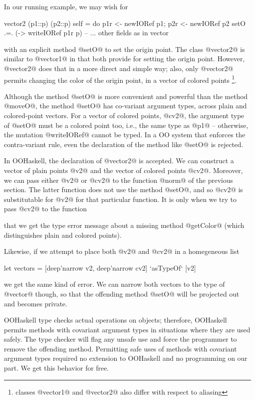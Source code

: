 \documentclass{jfp}
\begin{document}
In our running example, we may wish for
\begin{code}
vector2 (p1::p) (p2::p) self =
   do p1r <- newIORef p1; p2r <- newIORef p2
       setO     .=. (\p -> writeIORef p1r p)
       -- ... other fields as in vector 
\end{code}
with an explicit method @setO@ to set the origin point. The class
@vector2@ is similar to @vector1@ in that both provide for setting the
origin point. However, @vector2@ does that in a more direct and simple
way; also, only @vector2@ permits changing the color of the origin
point, in a vector of colored points \footnote{classes @vector1@ and
  @vector2@ also differ with respect to aliasing}.

Although the method @setO@ is more convenient and powerful than the
method @moveO@, the method @setO@ has co-variant argument types, across
plain and colored-point vectors. For a vector of colored points,
@cv2@, the argument type of @setO@ must be a colored point too, i.e.,
the same type as @p1@ -- otherwise, the mutation @writeIORef@ cannot
be typed. In a OO system that enforces the contra-variant rule, even
the declaration of the method like @setO@ is rejected.

In OOHaskell, the declaration of @vector2@ is accepted. We can
construct a vector of plain points @v2@ and the vector of colored
points @cv2@. Moreover, we can pass either @v2@ or @cv2@ to the
function @norm@ of the previous section. The latter function
does not use the method @setO@, and so @cv2@ is substitutable for @v2@
for that particular function. It is only when we try to pass @cv2@ to
the function
that we get the type error message about a missing method @getColor@
(which distinguishes plain and colored points). 

Likewise, if we attempt to place both @v2@ and @cv2@ in a homegeneous
list
\begin{code}
let vectors = [deep'narrow v2, deep'narrow cv2]
	      `asTypeOf` [v2]
\end{code}
we get the same kind of error. We can narrow both vectors to the type
of @vector@ though, so that the offending method @setO@ will be
projected out and becomes private.

OOHaskell type checks actual operations on objects; therefore,
OOHaskell permits methods with covariant argument types in situations
where they are used safely. The type checker will flag any unsafe use
and force the programmer to remove the offending method. Permitting
safe uses of methods with covariant argument types required no
extension to OOHaskell and no programming on our part. We get this
behavior for free.
\end{document}
